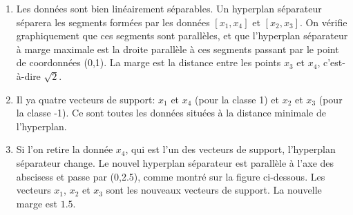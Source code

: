 \documentclass{article}
\begin{document}
\begin{enumerate}
\begin{enumerate}
	
	\item Les données sont bien linéairement séparables. Un hyperplan séparateur séparera les segments formées par les données $[x_1,x_4]$ et $[x_2,x_3]$. On vérifie graphiquement que ces segments sont parallèles, et que l'hyperplan séparateur à marge maximale est la droite parallèle à ces segments passant par le point de coordonnées (0,1). La marge est la distance entre les points $x_3$ et $x_4$, c'est-à-dire $\sqrt{2}$. 
	
	\item Il ya quatre vecteurs de support: $x_1$ et $x_4$ (pour la classe 1) et $x_2$ et $x_3$ (pour la classe -1). Ce sont toutes les données situées à la distance minimale de l'hyperplan.
	\bigbreak
	\begin{center}
	\end{center}
	
	\item Si l'on retire la donnée $x_4$, qui est l'un des vecteurs de support, l'hyperplan séparateur change. Le nouvel hyperplan séparateur est parallèle à l'axe des abscisess et passe par (0,2.5), comme montré sur la figure ci-dessous. Les vecteurs $x_1$, $x_2$ et $x_3$ sont les nouveaux vecteurs de support. La nouvelle marge est $1.5$.
	
	
	
	\end{enumerate}
	
	\end{enumerate}
	
\end{document}
